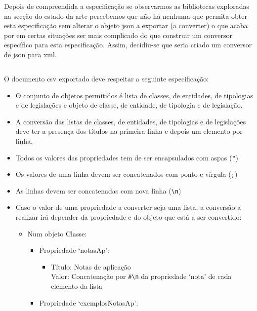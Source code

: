 Depois de compreendida a especificação se observarmos as bibliotecas exploradas na secção do estado da arte percebemos que não há nenhuma que permita obter esta especificação sem alterar o objeto \acrshort{json} a exportar (a converter) o que acaba por em certas situações ser mais complicado do que construir um conversor específico para esta especificação. Assim, decidiu-se que seria criado um conversor de \acrshort{json} para \acrshort{xml}.

\subsection{}

O documento \acrshort{csv} exportado deve respeitar a seguinte especificação:
\begin{itemize}
    \item O conjunto de objetos permitidos é lista de classes, de entidades, de tipologias e de legislações e objeto de classe, de entidade, de tipologia e de legislação.
    \item A conversão das listas de classes, de entidades, de tipologias e de legislações deve ter a presença dos títulos na primeira linha e depois um elemento por linha.
    \item Todos os valores das propriedades tem de ser encapsulados com aspas (\verb|"|)
    \item Os valores de uma linha devem ser concatenados com ponto e vírgula (\verb|;|)
    \item As linhas devem ser concatenadas com nova linha (\verb|\n|)
    \item Caso o valor de uma propriedade a converter seja uma lista, a conversão a realizar irá depender da propriedade e do objeto que está a ser convertido: 
    \begin{itemize}
        \item Num objeto Classe:
        \begin{itemize}
            \item Propriedade `notasAp':
            \begin{itemize}
                \item Título: Notas de aplicação \\
                      Valor: Concatenação por \verb|#\n| da propriedade `nota' de cada elemento da lista
            \end{itemize}
            \item Propriedade `exemplosNotasAp':
            \begin{itemize}

\end{itemize}
\end{itemize}
\end{itemize}
\end{itemize}
